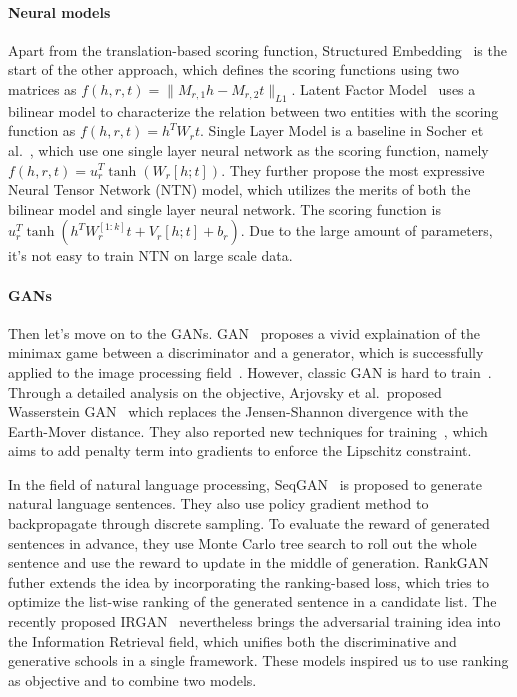 \documentclass[twocolumn,a4paper,10pt,preprint,3p]{elsarticle}
\begin{document}
\paragraph{Neural models} Apart from the translation-based scoring function, Structured Embedding~\cite{bordes2011structured_embedding} is the start of the other approach, which defines the scoring functions using two matrices as $f(h, r, t) = \lVert M_{r,1}h - M_{r,2}t \rVert_{L1}$. Latent Factor Model~\cite{jenatton2012bilinear} uses a bilinear model to characterize the relation between two entities with the scoring function as $f(h, r, t) = h^T W_r t$.
Single Layer Model is a baseline in Socher et al.~\cite{NTN}, which use one single layer neural network as the scoring function, namely $f(h, r, t)=u_r^T \tanh(W_r[h;t])$. They further propose the most expressive Neural Tensor Network (NTN) model, which utilizes the merits of both the bilinear model and single layer neural network. The scoring function is $u_r^T \tanh(h^T W_r^{[1:k]}t + V_r[h;t] + b_r)$. Due to the large amount of parameters, it's not easy to train NTN on large scale data.

\paragraph{GANs} Then let's move on to the GANs. GAN~\cite{GAN} proposes a vivid explaination of the minimax game between a discriminator and a generator, which is successfully applied to the image processing field~\cite{Ledig_2017_CVPR}. However, classic GAN is hard to train~\cite{Salimans_2016}. Through a detailed analysis on the objective, Arjovsky et al.\ proposed Wasserstein GAN~\cite{Arjovsky2017WGAN} which replaces the Jensen-Shannon divergence with the Earth-Mover distance. They also reported new techniques for training~\cite{Gulrajani2017LipschitzReg}, which aims to add penalty term into gradients to enforce the Lipschitz constraint.

In the field of natural language processing, SeqGAN~\cite{SeqGAN} is proposed to generate natural language sentences. They also use policy gradient method to backpropagate through discrete sampling. To evaluate the reward of generated sentences in advance, they use Monte Carlo tree search to roll out the whole sentence and use the reward to update in the middle of generation. RankGAN~\cite{RankGAN} futher extends the idea by incorporating the ranking-based loss, which tries to optimize the list-wise ranking of the generated sentence in a candidate list. The recently proposed IRGAN~\cite{IRGAN} nevertheless brings the adversarial training idea into the Information Retrieval field, which unifies both the discriminative and generative schools in a single framework. These models inspired us to use ranking as objective and to combine two models.
\end{document}
